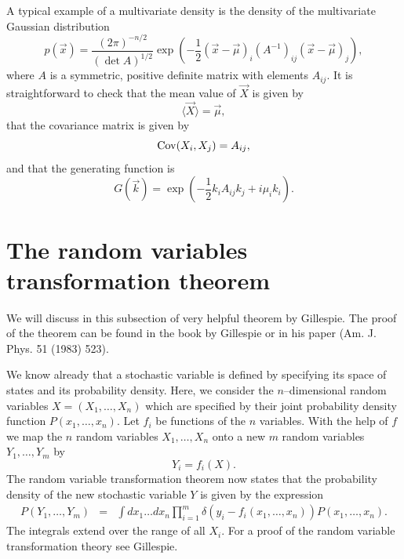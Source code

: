 A typical example of a multivariate density is the density of the multivariate 
Gaussian distribution
\begin{equation}
p(\vec{x}) = \frac{(2\pi)^{-n/2}}{(\det A)^{1/2}}
     \exp\left( -\frac{1}{2} (\vec{x} - \vec{\mu})_i (A^{-1})_{ij} 
     (\vec{x}-\vec{\mu})_j \right),
\end{equation}
where $A$ is a symmetric, positive definite matrix with elements 
$A_{ij}$. It is straightforward to check that the mean value of $\vec{X}$
is given by
\begin{equation}
\langle \vec{X} \rangle = \vec{\mu},
\end{equation}
that the covariance matrix is given by
\begin{equation}
{\rm Cov}(X_i, X_j) = A_{ij},
\end{equation}
and that the generating function is
\begin{equation}
G(\vec{k}) = \exp(-\frac{1}{2} k_i A_{ij} k_j + i \mu_ik_i).
\end{equation}

\section{The random variables transformation theorem}
We will discuss in this subsection of very helpful theorem by 
Gillespie. The proof of the theorem can be found in the book by
Gillespie or in his paper (Am. J. Phys. 51 (1983) 523). 

We know already that a stochastic variable is defined by 
specifying its space of states and its probability density.
Here, we consider the $n$--dimensional random variables $X=(X_1, \ldots, X_n)$ 
which are specified by their joint probability density function
$P(x_1, \ldots, x_n)$. Let $f_i$ be functions of the $n$ variables. With the 
help of $f$ we map the $n$ random variables $X_1, \ldots, X_n$ 
onto a new $m$ random variables $Y_1, \ldots, Y_m$ by
\begin{equation}
Y_i = f_i(X).
\end{equation}
The random variable transformation theorem now states that the 
probability density of the new stochastic variable $Y$ is given by
the expression
\begin{eqnarray}
\label{RVT}
P(Y_1, \ldots, Y_m) &=& \int dx_1 \ldots dx_n \prod_{i=1}^{m} 
\delta(y_i - f_i(x_1, \ldots, x_n)) P(x_1, \ldots, x_n).
\end{eqnarray}
The integrals extend over the range of all $X_i$.
For a proof of the random variable transformation theory see 
Gillespie.

